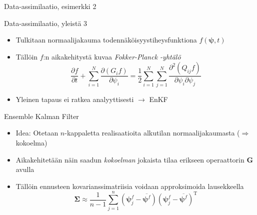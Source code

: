 \documentclass{beamer}
\begin{document}
\begin{frame}{Data-assimilaatio, esimerkki 2}

\begin{figure}
\end{figure}

\end{frame}

\begin{frame}{Data-assimilaatio, yleistä 3}

\begin{itemize}
\item Tulkitaan normaalijakauma todennäköisyystiheysfunktiona $f(\boldsymbol{\psi},t)$
\item Tällöin $f$:n aikakehitystä kuvaa \emph{Fokker-Planck -yhtälö}
\[
\frac{\partial f}{\partial t} + \sum_{i=1}^N \frac{\partial \left ( G_i f \right )}{\partial \psi_i} = \frac{1}{2} \sum_{i=1}^N \sum_{j=1}^N \frac{\partial^2 \left ( Q_{ij} f \right )}{\partial \psi_i \partial \psi_j}
\]
\item Yleinen tapaus ei ratkea analyyttisesti $\rightarrow$ EnKF
\end{itemize}

\end{frame}

\begin{frame}{Ensemble Kalman Filter}

\begin{itemize}
\item Idea: Otetaan $n$-kappaletta realisaatioita alkutilan normaalijakaumasta ($\Rightarrow$ kokoelma)
\item Aikakehitetään näin saadun \emph{kokoelman} jokaista tilaa erikseen operaattorin $\boldsymbol{G}$ avulla
\item Tällöin ennusteen kovarianssimatriisia voidaan approksimoida lausekkeella
\[
\boldsymbol{\Sigma} \approx \frac{1}{n-1} \sum_{j=1}^n \left( \boldsymbol{\psi}^f_j - \overline{\boldsymbol{\psi}^f} \right) \left(\boldsymbol{\psi}^f_j - \overline{\boldsymbol{\psi}^f}  \right)^\mathrm{T}
\]
\end{itemize}

\end{frame}
\end{document}
